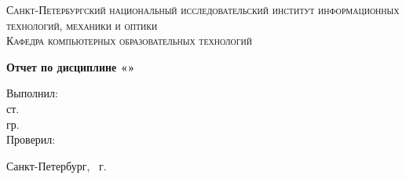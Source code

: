 \begin{titlepage}
    \begin{center}
        \textsc{Санкт-Петербургский национальный исследовательский институт информационных технологий, механики и оптики\\[5mm]
        Кафедра компьютерных образовательных технологий}

        \vfill

        \textbf{Отчет по дисциплине «\discipline»\\[3mm]
        }
    \end{center}

    \hfill
    \begin{minipage}{.5\textwidth}
        Выполнил:\\[2mm]
        ст. \student\\
        гр. \studentGroup\\[5mm]

        Проверил:\\[2mm]
        \tutor
    \end{minipage}%
    \vfill
    \begin{center}
        Санкт-Петербург, \theyear\ г.
    \end{center}
\end{titlepage}
